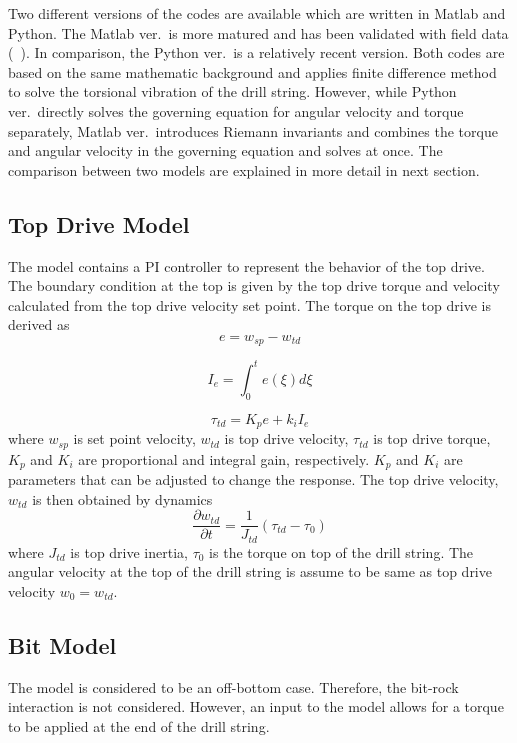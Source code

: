 Two different versions of the codes are available which are written in Matlab and Python. The Matlab ver.\ is more matured and has been validated with field data (~\cite{ref:aarsnes2017a}). In comparison, the Python ver.\ is a relatively recent version. Both codes are based on the same mathematic background and applies finite difference method to solve the torsional vibration of the drill string. However, while Python ver.\ directly solves the governing equation for angular velocity and torque separately, Matlab ver.\ introduces Riemann invariants and combines the torque and angular velocity in the governing equation and solves at once. The comparison between two models are explained in more detail in next section. 

\subsection{Top Drive Model}
The model contains a PI controller to represent the behavior of the top drive. The boundary condition at the top is given by the top drive torque and velocity calculated from the top drive velocity set point. The torque on the top drive is derived as
\begin{equation}\label{AS_err}
  e = w_{sp} - w_{td}
\end{equation}

\begin{equation}\label{AS_Ie}
  I_e = \int_{0}^{t}e(\xi)d\xi
\end{equation}

\begin{equation}\label{AS_tau_m}
  \tau_{td} = K_pe + k_i I_e
\end{equation}
where $w_{sp}$ is set point velocity, $w_{td}$ is top drive velocity, $\tau_{td}$ is top drive torque, $K_p$ and $K_i$ are proportional and integral gain, respectively. $K_p$ and $K_i$ are parameters that can be adjusted to change the response. The top drive velocity, $w_{td}$ is then obtained by dynamics
\begin{equation}\label{AS_w_td}
  \frac{\partial w_{td}}{\partial t} = \frac{1}{J_{td}}(\tau_{td} - \tau_0)
\end{equation}
where $J_{td}$ is top drive inertia, $\tau_{0}$ is the torque on top of the drill string. The angular velocity at the top of the drill string is assume to be same as top drive velocity $w_0 = w_{td}$.

\subsection{Bit Model}
\label{sec:asbitmodel}
The model is considered to be an off-bottom case.  Therefore, the bit-rock interaction is not considered.  However, an input to the model allows for a torque to be applied at the end of the drill string.

